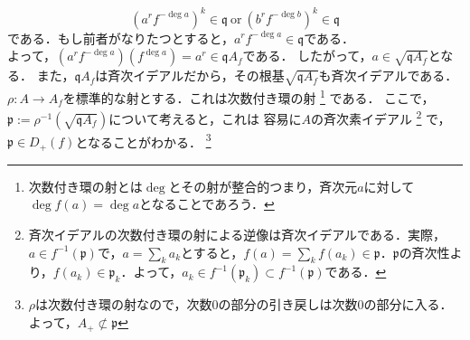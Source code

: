 {\begin{equation*}
    (a^{r}f^{-\deg{a}})^{k} \in \mathfrak{q}\ \text{or}\ (b^{r}f^{-\deg{b}})^{k} \in \mathfrak{q}
  \end{equation*}
  である．もし前者がなりたつとすると，$a^{r}f^{-\deg{a}}\in \mathfrak{q}$である．\\
  よって，$(a^{r}f^{-\deg{a}})(f^{\deg{a}}) = a^{r} \in \mathfrak{q}A_{f}$である．
  したがって，$a\in \sqrt{\mathfrak{q}A_{f}}$となる．
  また，$\mathfrak{q}A_{f}$は斉次イデアルだから，その根基$\sqrt{\mathfrak{q}A_{f}}$も斉次イデアルである．
  $\rho:A\to A_{f}$を標準的な射とする．これは次数付き環の射
  \footnote{次数付き環の射とは$\deg$とその射が整合的つまり，斉次元$a$に対して$\deg{f(a)} = \deg{a}$となることであろう．}
  である．
  ここで，$\mathfrak{p} := \rho^{-1}(\sqrt{\mathfrak{q}A_{f}})$について考えると，これは
  容易に$A$の斉次素イデアル
  \footnote{斉次イデアルの次数付き環の射による逆像は斉次イデアルである．実際，$a \in f^{-1}(\mathfrak{p})$で，$a=\sum_{k}a_{k}$とすると，$f(a) = \sum_{k}f(a_{k})\in \mathfrak{p}$．$\mathfrak{p}$の斉次性より，$f(a_{k})\in \mathfrak{p}_{k}$．よって，$a_{k} \in f^{-1}(\mathfrak{p}_{k}) \subset f^{-1}(\mathfrak{p})$である．}
  で，$\mathfrak{p}\in D_{+}(f)$となることがわかる．
  \footnote{$\rho$は次数付き環の射なので，次数$0$の部分の引き戻しは次数$0$の部分に入る．よって，$A_{+}\not \subset \mathfrak{p}$}
  
}







